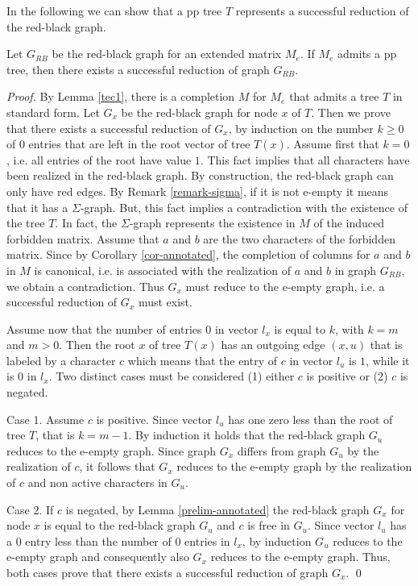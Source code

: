 \documentclass{llncs}
\begin{document}
 In the following we can show that a pp tree $T$  represents a successful reduction of the red-black graph.
 
\begin{lemma}
\label{first-direction}
Let $G_{RB}$ be the red-black graph for an extended matrix  $M_e$. If $M_e$  admits a  pp tree, then there exists a successful reduction of graph $G_{RB}$.
\end{lemma}

\begin{proof}

By Lemma \ref{tec1},   there is a  completion $M$ for $M_e$ that  admits  a tree $T$ in standard form.
Let $G_x$ be the red-black graph for  node $x$ of $T$. 
  Then we prove that there exists a successful reduction of $G_x$, by 
 induction on the number $k \geq 0 $ of  $0$ entries that are left in the root vector   of tree $T(x)$.
Assume first that $k =0$, i.e. all entries of the root have value $1$.  This fact implies that all characters have been realized in the red-black graph. By construction, the red-black graph can only have red edges.  By Remark \ref{remark-sigma},  if it is not e-empty it means that it has a $\Sigma$-graph. But, this fact implies  a contradiction with the existence of the tree $T$. In fact, the $\Sigma$-graph represents the existence in $M$ of the induced forbidden matrix. Assume that $a$ and $ b$ are the two characters of the forbidden matrix. Since by Corollary \ref{cor-annotated}, the completion of columns for $a$ and $b$ in $M$ is canonical, i.e. is associated with the realization of $a$ and $b$ in graph $G_{RB}$,  we obtain a contradiction. Thus $G_x$ must reduce to the e-empty graph, i.e. a successful reduction of $G_x$ must exist.

Assume now that the number of entries $0$ in vector $l_x$ is equal to $k$, with $k =m $ and $m >0$. Then the root  $x$ of tree $T(x) $ has an outgoing edge $(x,u)$ that is labeled by a character $c$ which means that the entry of $c$ in vector $l_u$ is $1$, while it is $0$ in $l_x$. Two distinct cases must be considered (1) either $c$ is positive or (2) $c$ is negated.


Case 1.  Assume $c$ is positive.
Since  vector $l_u$ has one zero less than the root of tree $T$, that is $k = m-1$. By  induction  it holds that the red-black graph $G_u$ reduces to the e-empty graph. Since graph $G_x$ differs from graph $G_u$ by the realization of $c$, it follows  that $G_x$ reduces to the e-empty graph by the realization of $c$ and non active characters in $G_u$.


Case 2. If $c$ is negated, by Lemma \ref{prelim-annotated}  the red-black graph $G_x$ for node $x$ is equal to the  red-black graph $G_u$ and $c$ is free in $G_u$.  Since vector $l_u$ has a $0$ entry less than  the number of $0$ entries in  $l_x$, by induction $G_u$ reduces to the e-empty graph and consequently also $G_x$ reduces to the e-empty graph. Thus, both cases prove that there exists a successful reduction of  graph $G_x$.
\qed

\end{proof}
\end{document}
